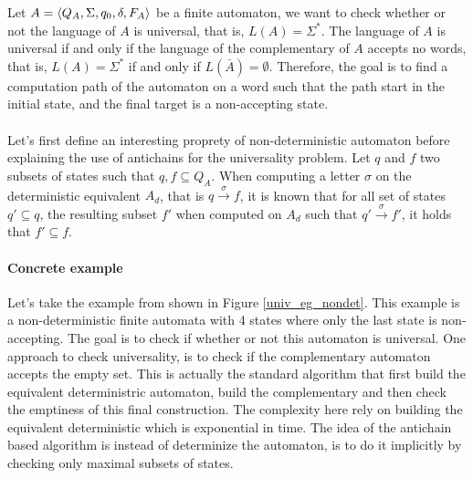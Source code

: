 \documentclass[letterpaper]{article}
\DeclarePairedDelimiter{\tuple}{\langle}{\rangle}
\theoremstyle{definition}
\begin{document}
Let $A = \tuple{Q_A, \Sigma, q_0, \delta, F_A}$ be a finite automaton,
we want to check whether or not
the language of $A$ is universal, that is, $L(A) = \Sigma^*$.
The language of $A$ is universal if and only if the language
of the complementary of $A$ accepts no words, that is,
$L(A) = \Sigma^*$ if and only if $L(\bar{A}) = \emptyset$.
Therefore, the goal is to find a computation path of the
automaton on a word such that the path start in the initial state,
and the final target is a non-accepting state.

\paragraph{}

Let's first define an interesting proprety of non-deterministic automaton
before explaining the use of antichains for the universality problem.
Let $q$ and $f$ two subsets of states such that $q, f \subseteq Q_A$.
When computing a letter $\sigma$ on the deterministic equivalent
$A_d$, that is $q \xrightarrow{\sigma} f$, it is known that
for all set of states $q' \subseteq q$, the resulting subset
$f'$ when computed on $A_d$ such that $q' \xrightarrow{\sigma} f'$,
it holds that $f' \subseteq f$.

\paragraph{Concrete example}

Let's take the example from \cite{AC_universality}
shown in Figure \ref{univ_eg_nondet}. This example is a
non-deterministic finite automata with 4 states where
only the last state is non-accepting.
The goal is to check
if whether or not this automaton is universal.
One approach to check universality, is to check if the
complementary automaton accepts the empty set.
This is actually the standard algorithm that first build
the equivalent deterministric automaton, build the complementary
and then check the emptiness of this final construction.
The complexity here rely on building the equivalent deterministic
which is exponential in time. The idea of the antichain based
algorithm is instead of determinize the automaton, is to
do it implicitly by checking only maximal subsets of states.

\paragraph{}
\end{document}
